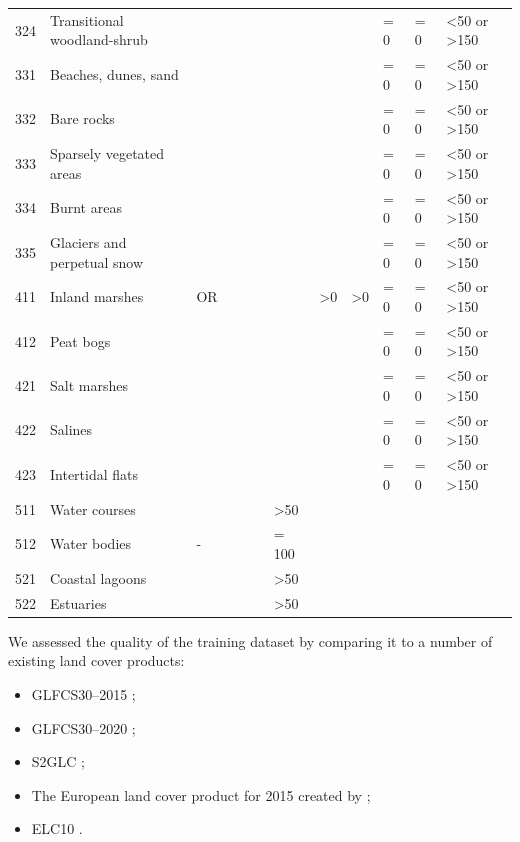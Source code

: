 \begin{table}[!hbt]
{\begin{tabular}{@{}lll|llllll|lll@{}}
    324 & Transitional woodland-shrub &  &  &  &  &  &  &  & = 0 & = 0 & \textless{}50 or \textgreater 150 \\
    331 & Beaches, dunes, sand &  &  &  &  &  &  &  & = 0 & = 0 & \textless{}50 or \textgreater 150 \\
    332 & Bare rocks &  &  &  &  &  &  &  & = 0 & = 0 & \textless{}50 or \textgreater 150 \\
    333 & Sparsely vegetated areas &  &  &  &  &  &  &  & = 0 & = 0 & \textless{}50 or \textgreater 150 \\
    334 & Burnt areas &  &  &  &  &  &  &  & = 0 & = 0 & \textless{}50 or \textgreater 150 \\
    335 & Glaciers and perpetual snow &  &  &  &  &  &  &  & = 0 & = 0 & \textless{}50 or \textgreater 150 \\
    411 & Inland marshes & OR &  &  &  &  & \textgreater{}0 & \textgreater{}0 & = 0 & = 0 & \textless{}50 or \textgreater 150 \\
    412 & Peat bogs &  &  &  &  &  &  &  & = 0 & = 0 & \textless{}50 or \textgreater 150 \\
    421 & Salt marshes &  &  &  &  &  &  &  & = 0 & = 0 & \textless{}50 or \textgreater 150 \\
    422 & Salines &  &  &  &  &  &  &  & = 0 & = 0 & \textless{}50 or \textgreater 150 \\
    423 & Intertidal flats &  &  &  &  &  &  &  & = 0 & = 0 & \textless{}50 or \textgreater 150 \\
    511 & Water courses &  &  &  &  & \textgreater{}50 &  &  &  &  &  \\
    512 & Water bodies & - &  &  &  & = 100 &  &  &  &  &  \\
    521 & Coastal lagoons &  &  &  &  & \textgreater{}50 &  &  &  &  &  \\
    522 & Estuaries &  &  &  &  & \textgreater{}50 &  &  &  &  &  \\ \bottomrule
    \end{tabular}%
    }
    \end{table}

    We assessed the quality of the training dataset by comparing it to a number of existing land cover products:
        
    \begin{itemize}
    \item GLFCS30--2015 \citep{zhang2020glc_fcs30};
    \item GLFCS30--2020 \citep{zhang2020glc_fcs30};
    \item S2GLC \citep{malinowski2020};
    \item The European land cover product for 2015 created by \citet{pflugmacher2019mapping};
    \item  ELC10 \citep{venter2021continentalscale}.
    \end{itemize}
    
